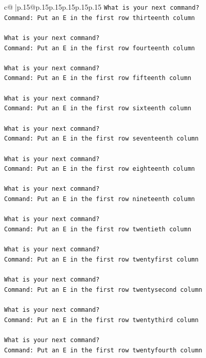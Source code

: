 \documentclass{article}
\begin{document}
{\begin{supertabular}{c@{$\;$}|p{.15\linewidth}@{}p{.15\linewidth}p{.15\linewidth}p{.15\linewidth}p{.15\linewidth}p{.15\linewidth}}
{{{\texttt{What is your next command?} \\
\texttt{Command: Put an E in the first row thirteenth column} \\
\\ 
\texttt{What is your next command?} \\
\texttt{Command: Put an E in the first row fourteenth column} \\
\\ 
\texttt{What is your next command?} \\
\texttt{Command: Put an E in the first row fifteenth column} \\
\\ 
\texttt{What is your next command?} \\
\texttt{Command: Put an E in the first row sixteenth column} \\
\\ 
\texttt{What is your next command?} \\
\texttt{Command: Put an E in the first row seventeenth column} \\
\\ 
\texttt{What is your next command?} \\
\texttt{Command: Put an E in the first row eighteenth column} \\
\\ 
\texttt{What is your next command?} \\
\texttt{Command: Put an E in the first row nineteenth column} \\
\\ 
\texttt{What is your next command?} \\
\texttt{Command: Put an E in the first row twentieth column} \\
\\ 
\texttt{What is your next command?} \\
\texttt{Command: Put an E in the first row twentyfirst column} \\
\\ 
\texttt{What is your next command?} \\
\texttt{Command: Put an E in the first row twentysecond column} \\
\\ 
\texttt{What is your next command?} \\
\texttt{Command: Put an E in the first row twentythird column} \\
\\ 
\texttt{What is your next command?} \\
\texttt{Command: Put an E in the first row twentyfourth column} \\
}}}
\end{supertabular}}
\end{document}
